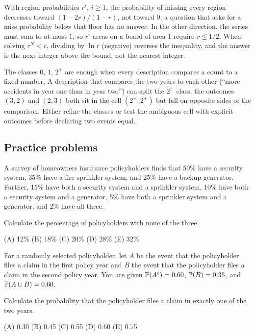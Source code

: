 \begin{trap}
With region probabilities $r^i$, $i \ge 1$, the probability of missing every
region decreases toward $(1-2r)/(1-r)$, not toward $0$; a question that asks for a miss
probability below that floor has no answer. In the other direction, the series must
sum to at most $1$, so $r^i$ areas on a board of area $1$ require $r \le 1/2$. When
solving $r^N < c$, dividing by $\ln r$ (negative) reverses the inequality, and the
answer is the next integer above the bound, not the nearest integer.
\end{trap}

\begin{trap}
The classes $0$, $1$, $2^{+}$ are enough when every description compares a count
to a fixed number. A description that compares the two years to each other (``more
accidents in year one than in year two'') can split the $2^{+}$ class: the outcomes
$(3,2)$ and $(2,3)$ both sit in the cell $(2^{+}, 2^{+})$ but fall on opposite sides of
the comparison. Either refine the classes or test the ambiguous cell with explicit
outcomes before declaring two events equal.
\end{trap}

\subsection{Practice problems}

\begin{practice}
A survey of homeowners insurance policyholders finds that 50\% have a security
system, 35\% have a fire sprinkler system, and 25\% have a backup generator.
Further, 15\% have both a security system and a sprinkler system, 10\% have both a
security system and a generator, 5\% have both a sprinkler system and a generator,
and 2\% have all three.

Calculate the percentage of policyholders with none of the three.

(A) 12\% \quad (B) 18\% \quad (C) 20\% \quad (D) 28\% \quad (E) 32\%
\end{practice}

\begin{practice}
For a randomly selected policyholder, let $A$ be the event that the policyholder
files a claim in the first policy year and $B$ the event that the policyholder
files a claim in the second policy year. You are given
$\mathbb{P}(A^{\mathrm{c}}) = 0.60$, $\mathbb{P}(B) = 0.35$, and $\mathbb{P}(A \cup B) = 0.60$.

Calculate the probability that the policyholder files a claim in exactly one of the
two years.

(A) 0.30 \quad (B) 0.45 \quad (C) 0.55 \quad (D) 0.60 \quad (E) 0.75
\end{practice}

